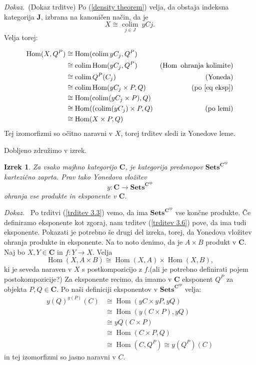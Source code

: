 \documentclass[12pt,a4paper]{book}
\theoremstyle{definition}
\theoremstyle{plain}
\newtheorem{izrek}[definicija]{Izrek}
\newenvironment{dokaz}{\emph{Dokaz.}\ }{\hspace{\fill}{$\Box$}}
\theoremstyle{definition}
\theoremstyle{remark}
\newcommand{\cat}[1]{\textbf{#1}}
\DeclareMathOperator{\Hom}{Hom}
\DeclareMathOperator{\colim}{colim}
\newcommand{\predsnop}[1]{\cat{Sets}^{\cat{#1}^{op}}}
\begin{document}
\begin{dokaz}(Dokaz trditve)
Po (\ref{density theorem}) velja, da obstaja indeksna kategorija $\cat{J}$, izbrana na kanoničen način, da je
$$ X \cong \underset{j \in J}{\colim}\> yCj.$$
Velja torej:

\begin{align*}
\Hom(X, Q^P) &\cong \Hom(\colim yC_j, Q^P) & \\
&\cong \colim\Hom(yC_j, Q^P) & (\Hom \text{ ohranja kolimite}) \\
&\cong \colim Q^P(C_j) & (\text{Yoneda}) \\
&\cong \colim \Hom(yC_j \times P, Q) & (\text{po \ref{eq eksp}}) \\
&\cong \Hom(\colim(yC_j \times P), Q) & \\
&\cong \Hom((\colim(yC_j) \times P, Q) & (\text{po lemi}) \\
&\cong \Hom(X \times P, Q) \\
\end{align*}
Tej izomorfizmi so očitno naravni v $X$, torej trditev sledi iz Yonedove leme.
\end{dokaz}

Dobljeno združimo v izrek.

\begin{izrek}
Za vsako majhno kategorijo $\cat{C}$, je kategorija predsnopov $\predsnop{C}$ kartezično zaprta. Prav tako Yonedova vložitev
$$y : \cat{C} \to \predsnop{C}$$
ohranja vse produkte in eksponente v $\cat{C}$.
\end{izrek}
\begin{dokaz}
Po trditvi (\ref{trditev 3.3}) vemo, da ima $\predsnop{C}$ vse končne produkte. Če definiramo eksponente kot zgoraj, nam trditev (\ref{trditev 3.6}) pove, da ima tudi eksponente.
Pokazati je potrebno še drugi del izreka, torej, da Yonedova vložitev ohranja produkte in eksponente. Na to noto denimo, da je $A \times B$ produkt v $\cat{C}$.
Naj bo $X,Y \in \cat{C}$ in $f : Y \to X$. Velja
$$ \Hom(X, A\times B) \cong \Hom(X, A) \times \Hom(X,B),$$
ki je seveda naraven v $X$ s postkompozicijo z $f$.(ali je potrebno definirati pojem postokompozicije?)
Za eksponente recimo, da imamo v $\cat{C}$ eksponent $Q^P$ za objekta $P,Q \in \cat{C}$. Po naši definiciji eksponentov v $\predsnop{C}$ velja:
\begin{align*}
y(Q)^{y(P)}(C) & \cong \Hom(yC \times yP, yQ) \\
&\cong \Hom(y(C \times P), yQ) \\
&\cong yQ(C \times P) \\
&\cong \Hom(C \times P, Q) \\
&\cong \Hom(C, Q^P) \cong y(Q^P)(C)
\end{align*}
in tej izomorfizmi so jasno naravni v $C$.
\end{dokaz}
\end{document}
